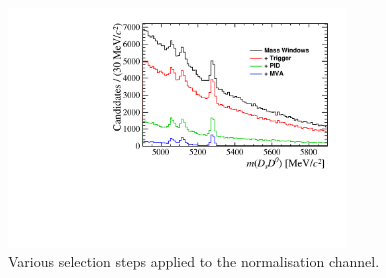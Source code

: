 \begin{figure}[!h]
    \centering
        \includegraphics[width=0.8\textwidth]{figs/Selection/Normalisation_with_sel_B2DsD0.pdf}
    \caption{Various selection steps applied to the normalisation channel.}
    \label{fig:norm_selection}   
\end{figure}


